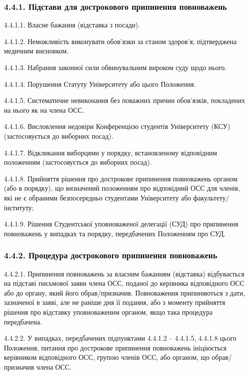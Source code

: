     \subsubsection*{4.4.1. Підстави для дострокового припинення повноважень}
        4.4.1.1. Власне бажання (відставка з посади).

        4.4.1.2. Неможливість виконувати обов'язки за станом здоров'я, підтверджена медичним висновком.

        4.4.1.3. Набрання законної сили обвинувальним вироком суду щодо нього.

        4.4.1.4. Порушення Статуту Університету або цього Положення.

        4.4.1.5. Систематичне невиконання без поважних причин обов'язків, покладених на нього як на члена ОСС.

        4.4.1.6. Висловлення недовіри Конференцією студентів Університету (КСУ) (застосовується до виборних посад).

        4.4.1.7. Відкликання виборцями у порядку, встановленому відповідним положенням (застосовується до виборних посад).

        4.4.1.8. Прийняття рішення про дострокове припинення повноважень органом (або в порядку), що визначений положенням про відповідний ОСС для членів, які не є обраними безпосередньо студентами Університету або факультету/інституту;

        4.4.1.9. Рішення Студентської уповноваженої делегації (СУД) про припинення повноважень у випадках та порядку, передбачених Положенням про СУД.

    \subsubsection*{4.4.2. Процедура дострокового припинення повноважень}
        4.4.2.1. Припинення повноважень за власним бажанням (відставка) відбувається на підставі письмової заяви члена ОСС, поданої до керівника відповідного ОСС або до органу, який його обрав/призначив. Повноваження припиняються з дати, зазначеної в заяві, але не раніше дня її подання, або з моменту прийняття рішення про відставку уповноваженим органом, якщо така процедура передбачена.

        4.4.2.2. У випадках, передбачених підпунктами 4.4.1.2 – 4.4.1.5, 4.4.1.8 цього Положення, питання про дострокове припинення повноважень ініціюється керівником відповідного ОСС, групою членів ОСС, або органом, що обрав/призначив члена ОСС.

